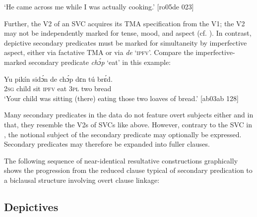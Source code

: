 \glt ‘He came across me while I was actually cooking.’ [ro05de 023]
\z

Further, the V2 of an SVC acquires its TMA specification from the V1; the V2 may not be independently marked for tense, mood, and aspect (cf. ). In contrast, depictive secondary predicates must be marked for simultaneity by imperfective aspect, either via factative TMA or via \textit{de} ‘\textsc{ipfv’.} Compare the imperfective-marked secondary predicate \textit{chɔ́p} ‘eat’ in this example: 


\ea%
    \label{ex:key:1589}
    \gll Yu  pikín  sidɔ́n  de  chɔ́p  dɛn  tú  brɛ́d.\\
\textsc{2sg}  child  sit    \textsc{ipfv}  eat    \textsc{3pl}  two  bread\\

\glt ‘Your child was sitting (there) eating those two loaves of bread.’ [ab03ab 128]
\z

Many secondary predicates in the data do not feature overt subjects either and in that, they resemble the V2s of SVCs like  above. However, contrary to the SVC in , the notional subject of the secondary predicate may optionally be expressed. Secondary predicates may therefore be expanded into fuller clauses. 


The following sequence of near-identical resultative constructions graphically shows the progression from the reduced clause typical of secondary predication to a biclausal structure involving overt clause linkage:



\ea%
    \label{ex:key:1590}
\z\z

\subsection{Depictives}\label{sec:11.3.2}

